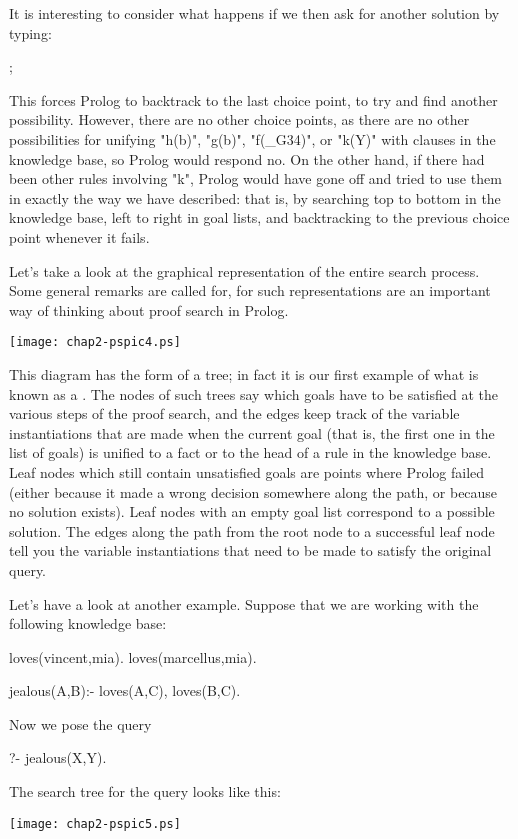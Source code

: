 It is interesting to consider what happens if we then ask for another
solution by typing:
\begin{LPNcodedisplay}
;
\end{LPNcodedisplay}
This forces Prolog to backtrack to the last choice point, to try and
find another possibility. However, there are no other choice points, as
there are no other possibilities for unifying "h(b)", "g(b)",
"f(_G34)", or "k(Y)" with clauses in the knowledge base, so Prolog
would respond no.  On the other hand, if there had been other rules
involving "k", Prolog would have gone off and tried to use them in
exactly the way we have described: that is, by searching top to bottom
in the knowledge base, left to right in goal lists, and backtracking
to the previous choice point whenever it fails.


Let's take a look at the graphical representation of the entire search
process. Some general remarks are called for, for such representations
are an important way of thinking about proof search in Prolog.
%
\begin{center}
\texttt{[image: chap2-pspic4.ps]}
\end{center}
This diagram has the form of a tree; in fact it is our first example
of what is known as a .  The nodes of such trees
say which goals have to be satisfied at the various steps of the proof
search, and the edges keep track of the variable instantiations that
are made when the current goal (that is, the first one in the list of
goals) is unified to a fact or to the head of a rule in the knowledge
base.  Leaf nodes which still contain unsatisfied goals are points
where Prolog failed (either because it made a wrong decision somewhere
along the path, or because no solution exists). Leaf nodes with an
empty goal list correspond to a possible solution.  The edges along
the path from the root node to a successful leaf node tell you the
variable instantiations that need to be made to satisfy the original
query.

Let's have a look at another example. Suppose that we are working with
the following knowledge base:
\begin{LPNcodedisplay}
loves(vincent,mia).
loves(marcellus,mia).

jealous(A,B):- loves(A,C), loves(B,C).
\end{LPNcodedisplay}
%
Now we pose the query
\begin{LPNcodedisplay}
?- jealous(X,Y).
\end{LPNcodedisplay}
%
The search tree for the query looks like this:
%
\begin{center}
\texttt{[image: chap2-pspic5.ps]}
\end{center}

